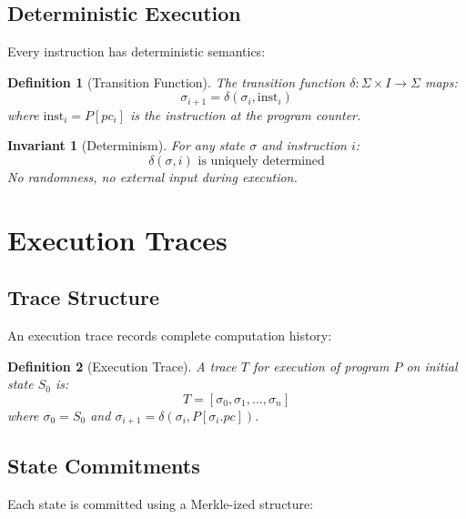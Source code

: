 \documentclass[11pt,a4paper]{article}
\newtheorem{definition}{Definition}
\newtheorem{invariant}{Invariant}
\begin{document}
\subsection{Deterministic Execution}

Every instruction has deterministic semantics:

\begin{definition}[Transition Function]
The transition function $\delta: \Sigma \times I \to \Sigma$ maps:
\begin{equation}
    \sigma_{i+1} = \delta(\sigma_i, \text{inst}_i)
\end{equation}
where $\text{inst}_i = P[pc_i]$ is the instruction at the program counter.
\end{definition}

\begin{invariant}[Determinism]
For any state $\sigma$ and instruction $i$:
\begin{equation}
    \delta(\sigma, i) \text{ is uniquely determined}
\end{equation}
No randomness, no external input during execution.
\end{invariant}

\section{Execution Traces}

\subsection{Trace Structure}

An execution trace records complete computation history:

\begin{definition}[Execution Trace]
A trace $T$ for execution of program $P$ on initial state $S_0$ is:
\begin{equation}
    T = [\sigma_0, \sigma_1, \ldots, \sigma_n]
\end{equation}
where $\sigma_0 = S_0$ and $\sigma_{i+1} = \delta(\sigma_i, P[\sigma_i.pc])$.
\end{definition}

\subsection{State Commitments}

Each state is committed using a Merkle-ized structure:
\end{document}
